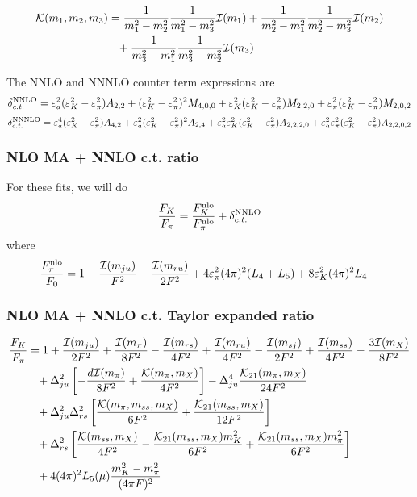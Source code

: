 \documentclass[prd,11pt,tightenlines,preprintnumbers,showpacs,superscriptaddress,notitlepage,nofootinbib,eqsecnum,floatfix]{revtex4-1}
\begin{document}
\begin{align}
{\mathcal K}(m_1,m_2,m_3) &= \frac{1}{m_1^2 - m_2^2}\frac{1}{m_1^2-m_3^2} {\mathcal I}(m_1)
	+\frac{1}{m_2^2 - m_1^2} \frac{1}{m_2^2 - m_3^2} {\mathcal I}(m_2)
\nonumber\\&\phantom{=}
	+\frac{1}{m_3^2 - m_1^2} \frac{1}{m_3^2 - m_2^2} {\mathcal I}(m_3)
\end{align}


The NNLO and NNNLO counter term expressions are 
\begin{equation}
{\delta}_{c.t.}^{\rm NNLO} = {\varepsilon}_a^2 ({\varepsilon}_K^2 - {\varepsilon}_\pi^2) A_{2,2}
	+({\varepsilon}_K^2 - {\varepsilon}_\pi^2)^2 M_{4,0,0}
	+{\varepsilon}_K^2 ({\varepsilon}_K^2 - {\varepsilon}_\pi^2) M_{2,2,0}
	+{\varepsilon}_\pi^2 ({\varepsilon}_K^2 - {\varepsilon}_\pi^2) M_{2,0,2}
\end{equation}
\begin{equation}
{\delta}_{c.t.}^{\rm NNNLO} = {\varepsilon}_a^4 ({\varepsilon}_K^2 - {\varepsilon}_\pi^2) A_{4,2}
	+{\varepsilon}_a^2 ({\varepsilon}_K^2 - {\varepsilon}_\pi^2)^2 A_{2,4}
	+{\varepsilon}_a^2 {\varepsilon}_K^2 ({\varepsilon}_K^2 - {\varepsilon}_\pi^2) A_{2,2,2,0}
	+{\varepsilon}_a^2 {\varepsilon}_\pi^2 ({\varepsilon}_K^2 - {\varepsilon}_\pi^2) A_{2,2,0,2}
\end{equation}




\subsubsection{NLO MA + NNLO c.t. ratio}
For these fits, we will do
\begin{equation}
\frac{F_K}{F_\pi} = \frac{F_K^{\rm nlo}}{F_\pi^{\rm nlo}} + {\delta}_{c.t.}^{\rm NNLO}
\end{equation}
where
\begin{align}
\frac{F_\pi^{\rm nlo}}{F_0} &= 
	1 
	- \frac{{\mathcal I}(m_{ju})}{F^2}
	-\frac{{\mathcal I}(m_{ru})}{2F^2}
	+4 {\varepsilon}_\pi^2 (4\pi)^2 (L_4 + L_5)
	+8 {\varepsilon}_K^2 (4\pi)^2 L_4
\end{align}




\subsubsection{NLO MA + NNLO c.t. Taylor expanded ratio}
\begin{align}\label{eq:fkfpi_ma}
\frac{F_K}{F_\pi} &= 1
	+\frac{{\mathcal I(m_{ju})}}{2F^2}
	+\frac{{\mathcal I}(m_\pi)}{8F^2}
	-\frac{{\mathcal I}(m_{rs})}{4F^2}
	+\frac{{\mathcal I}(m_{ru})}{4F^2}
	-\frac{{\mathcal I}(m_{sj})}{2F^2}
	+\frac{{\mathcal I}(m_{ss})}{4F^2}
	-\frac{3{\mathcal I}(m_X)}{8F^2}
\nonumber\\&\phantom{=}
	+{\Delta}_{ju}^2 \left[ -\frac{d{\mathcal I}(m_\pi)}{8F^2} + \frac{{\mathcal K(}m_\pi,m_X)}{4F^2} \right]
	-{\Delta}_{ju}^4 \frac{{\mathcal K}_{21}(m_\pi,m_X)}{24 F^2}
\nonumber\\&\phantom{=}
	+{\Delta}_{ju}^2{\Delta}_{rs}^2 \left[ \frac{{\mathcal K}(m_\pi, m_{ss}, m_X)}{6F^2}
		+\frac{{\mathcal K}_{21}(m_{ss},m_X)}{12F^2} \right]
\nonumber\\&\phantom{=}
	+{\Delta}_{rs}^2 \left[
		\frac{{\mathcal K}(m_{ss},m_X)}{4F^2} 
		-\frac{{\mathcal K}_{21}(m_{ss},m_X) m_K^2}{6F^2}
		+\frac{{\mathcal K}_{21}(m_{ss},m_X) m_\pi^2}{6F^2}
		\right]
\nonumber\\&\phantom{=}
	+ 4 (4\pi)^2 L_5(\mu) \frac{m_K^2 - m_\pi^2}{(4\pi F)^2}
\end{align}
\end{document}
